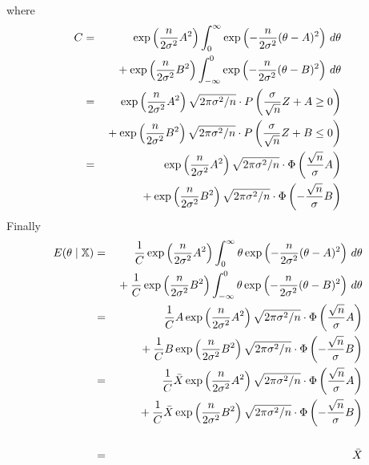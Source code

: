 \documentclass[12pt]{article}
\begin{document}
where
\begin{eqnarray*}
C&=&
\exp\left({n\over2\sigma^2}A^2\right)
\int_0^\infty\exp\left(-{n\over2\sigma^2}(\theta-A)^2\right)\,d\theta\\
&&{}+
\exp\left({n\over2\sigma^2}B^2\right)
\int_{-\infty}^0\exp\left(-{n\over2\sigma^2}(\theta-B)^2\right)\,d\theta\\
&=&
\exp\left({n\over2\sigma^2}A^2\right)
\sqrt{2\pi\sigma^2/n}\cdot
P\left({\sigma\over\sqrt n}Z+A\ge0\right)\\
&&{}+
\exp\left({n\over2\sigma^2}B^2\right)
\sqrt{2\pi\sigma^2/n}\cdot
P\left({\sigma\over\sqrt n}Z+B\le0\right)\\
&=&
\exp\left({n\over2\sigma^2}A^2\right)
\sqrt{2\pi\sigma^2/n}\cdot
\Phi\left({\sqrt n\over\sigma}A\right)\\
&&{}+
\exp\left({n\over2\sigma^2}B^2\right)
\sqrt{2\pi\sigma^2/n}\cdot
\Phi\left(-{\sqrt n\over\sigma}B\right)\\
\end{eqnarray*}
%
Finally
\begin{eqnarray*}
E(\theta\mid\mathbb X)&=&
{1\over C}
\exp\left({n\over2\sigma^2}A^2\right)
\int_0^\infty\theta\exp\left(-{n\over2\sigma^2}(\theta-A)^2\right)
\,d\theta
\\
&&{}+
{1\over C}
\exp\left({n\over2\sigma^2}B^2\right)
\int_{-\infty}^0
\theta
\exp\left(-{n\over2\sigma^2}(\theta-B)^2\right)
\,d\theta\\
%
&=&
{1\over C}
A\exp\left({n\over2\sigma^2}A^2\right)
\sqrt{2\pi\sigma^2/n}
\cdot\Phi\left({\sqrt n\over\sigma}A\right)\\
&&{}+
{1\over C}
B\exp\left({n\over2\sigma^2}B^2\right)
\sqrt{2\pi\sigma^2/n}
\cdot\Phi\left(-{\sqrt n\over\sigma}B\right)\\
%
&=&
{1\over C}
\bar X\exp\left({n\over2\sigma^2}A^2\right)
\sqrt{2\pi\sigma^2/n}
\cdot\Phi\left({\sqrt n\over\sigma}A\right)\\
&&{}+
{1\over C}
\bar X\exp\left({n\over2\sigma^2}B^2\right)
\sqrt{2\pi\sigma^2/n}
\cdot\Phi\left(-{\sqrt n\over\sigma}B\right)\\
\\
&=&\bar X
\end{eqnarray*}
\end{document}
